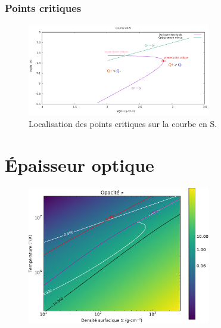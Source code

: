 \begin{frame}		
\frametitle{Points critiques}		
		
   \begin{figure}[htb!]		
      \includegraphics[width=8cm]{figures/points_critiques.png}		
      \caption{Localisation des points critiques sur la courbe en S.}		
    \end{figure}		
\end{frame}		



\section{Épaisseur optique}
\begin{frame}

   \begin{figure}[htb!]
      \includegraphics[width=8cm]{figures/tau_map.pdf}
   \end{figure}
\end{frame}

